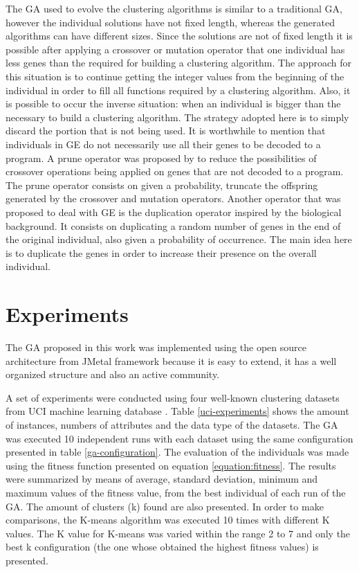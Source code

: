 \documentclass[journal]{IEEEtran}
\begin{document}
	The GA used to evolve the clustering algorithms is similar to a traditional GA, however the individual solutions have not fixed length, whereas the generated algorithms can have different sizes. Since the solutions are not of fixed length it is possible after applying a crossover or mutation operator that one individual has less genes than the required for building a clustering algorithm. The approach for this situation is to continue getting the integer values from the beginning of the individual in order to fill all functions required by a clustering algorithm. Also, it is possible to occur the inverse situation: when an individual is bigger than the necessary to build a clustering algorithm. The strategy adopted here is to simply discard the portion that is not being used. It is worthwhile to mention that individuals in GE do not necessarily use all their genes to be decoded to a program. A prune operator was proposed by \cite{ryan1998grammatical} to reduce the possibilities of crossover operations being applied on genes that are not decoded to a program. The prune operator consists on given a probability, truncate the offspring generated by the crossover and mutation operators. Another operator that was proposed to deal with GE is the duplication operator inspired by the biological background. It consists on duplicating a random number of genes in the end of the original individual, also given a probability of occurrence. The main idea here is to duplicate the genes in order to increase their presence on the overall individual.
	
	\section{Experiments} \label{sec:experiments}
	
	The GA proposed in this work was implemented using the open source architecture from JMetal framework \cite{jMetal} because it is easy to extend, it has a well organized structure and also an active community.  
	
	A set of experiments were conducted using  four well-known clustering datasets from UCI machine learning database \cite{uci}. Table \ref{uci-experiments} shows the amount of instances, numbers of attributes and the data type of the datasets. 
	The GA was executed 10 independent runs with each dataset using the same configuration presented in table \ref{ga-configuration}. The evaluation of the individuals was made using the fitness function presented on equation \ref{equation:fitness}.
	The results were summarized by means of average, standard deviation, minimum and maximum values of the fitness value,  from the best individual of each run of the GA. The amount of clusters (k) found are also presented.
	In order to make comparisons, the K-means algorithm was executed 10 times with different K values. The K value for K-means was varied within the range 2 to 7 and only the best k configuration (the one whose obtained the highest fitness values) is presented. 
	
\end{document}
